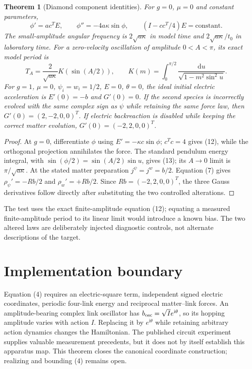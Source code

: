 \documentclass[10pt,a4paper]{article}
\newtheorem{theorem}{Theorem}
\newcommand{\dd}{\mathrm d}
\newcommand{\ii}{\mathrm i}
\begin{document}
\begin{theorem}[Diamond component identities]\label{th:diamond}
For $g=0$, $\mu=0$ and constant parameters,
\[
\phi'=a c^TE,\qquad \phi''=-4a\kappa\sin\phi,\qquad
(I-cc^T/4)E=\text{constant}.
\tag{12}
\]
The small-amplitude angular frequency is $2\sqrt{a\kappa}$ in model time and $2\sqrt{a\kappa}/t_0$ in laboratory time. For a zero-velocity oscillation of amplitude $0<A<\pi$, its exact model period is
\[
T_A=\frac{2}{\sqrt{a\kappa}}K(\sin(A/2)),\qquad
K(m)=\int_0^{\pi/2}\frac{\dd u}{\sqrt{1-m^2\sin^2u}}.
\tag{13}
\]
For $g=1$, $\mu=0$, $\psi_i=w_i=1/2$, $E=0$, $\theta=0$, the ideal initial electric acceleration is $E'(0)=-b$ and $G'(0)=0$. If the second species is incorrectly evolved with the same complex sign as $\psi$ while retaining the same force law, then $G'(0)=(2,-2,0,0)^T$. If electric backreaction is disabled while keeping the correct matter evolution, $G'(0)=(-2,2,0,0)^T$.
\end{theorem}
\begin{proof}
At $g=0$, differentiate $\phi$ using $E'=-\kappa c\sin\phi$; $c^Tc=4$ gives (12), while the orthogonal projection annihilates the force. The standard pendulum energy integral, with $\sin(\phi/2)=\sin(A/2)\sin u$, gives (13); its $A\to0$ limit is $\pi/\sqrt{a\kappa}$. At the stated matter preparation $j^\psi=j^w=b/2$. Equation (7) gives $\rho_\psi'=-Rb/2$ and $\rho_w'=+Rb/2$. Since $Rb=(-2,2,0,0)^T$, the three Gauss derivatives follow directly after substituting the two controlled alterations.
\end{proof}
The test uses the exact finite-amplitude equation (12); equating a measured finite-amplitude period to its linear limit would introduce a known bias. The two altered laws are deliberately injected diagnostic controls, not alternate descriptions of the target.

\section{Implementation boundary}
Equation (4) requires an electric-square term, independent signed electric coordinates, periodic four-link energy and reciprocal matter--link forces. An amplitude-bearing complex link oscillator has $b_{\rm osc}=\sqrt I e^{\ii\theta}$, so its hopping amplitude varies with action $I$. Replacing it by $e^{\ii\theta}$ while retaining arbitrary action dynamics changes the Hamiltonian. The published circuit experiment supplies valuable measurement precedents, but it does not by itself establish this apparatus map. This theorem closes the canonical coordinate construction; realizing and bounding (4) remains open.
\end{document}

